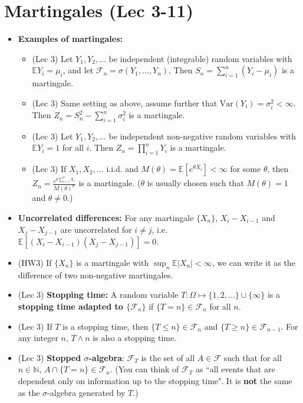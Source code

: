 \documentclass[twoside]{article}
\newcommand{\dis}{\displaystyle}
\newcommand\bbE{\mathbb{E}}
\newcommand\bbN{\mathbb{N}}
\newcommand\calF{\mathcal{F}}
\newcommand\Om{\Omega}
\newcommand\sg{\sigma}
\def\t{\theta}
\begin{document}
\section*{Martingales (Lec 3-11)}
\begin{itemize}
\item \textbf{Examples of martingales:}
\begin{itemize}
\item (Lec 3) Let $Y_1, Y_2, \dots$ be independent (integrable) random variables with $\bbE Y_i = \mu_i$, and let $\calF_n = \sg(Y_1, \dots, Y_n)$. Then $S_n = \dis\sum_{i=1}^n (Y_i - \mu_i)$ is a martingale.

\item (Lec 3) Same setting as above, assume further that $\text{Var} (Y_i) = \sg_i^2 < \infty$. Then $Z_n = S_n^2 - \dis\sum_{i=1}^n \sg_i^2$ is a martingale.

\item (Lec 3) Let $Y_1, Y_2, \dots$ be independent non-negative random variables with $\bbE Y_i = 1$ for all $i$. Then $Z_n = \dis\prod_{i=1}^n Y_i$ is a martingale.

\item (Lec 3) If $X_1, X_2, \dots$ i.i.d. and $M(\t) = \bbE [e^{\t X_i}] < \infty$ for some $\t$, then $Z_n = \dis\frac{e^{\t \sum_{i=1}^n X_i}}{M(\t)^n}$ is a martingale. ($\t$ is usually chosen such that $M(\t) = 1$ and $\t \neq 0$.)
\end{itemize}

\item \textbf{Uncorrelated differences:} For any martingale $\{ X_n \}$, $X_i - X_{i-1}$ and $X_j - X_{j-1}$ are uncorrelated for $i \neq j$, i.e. $\bbE[(X_i - X_{i-1})(X_j - X_{j-1})] = 0$.

\item (HW3) If $\{X_n\}$ is a martingale with $\dis\sup_n \bbE|X_n| < \infty$, we can write it as the difference of two non-negative martingales.

\item (Lec 3) \textbf{Stopping time:} A random variable $T : \Om \mapsto \{1, 2, \dots \} \cup \{ \infty \}$ is a \textbf{stopping time adapted to $\{\calF_n \}$} if $\{ T = n \} \in \calF_n$ for all $n$.

\item (Lec 3) If $T$ is a stopping time, then $\{ T \leq n\} \in \calF_n$ and $\{ T \geq n \} \in \calF_{n-1}$. For any integer $n$, $T \wedge n$ is also a stopping time.

\item (Lec 3) \textbf{Stopped $\sg$-algebra}: $\calF_T$ is the set of all $A \in \calF$ such that for all $n \in \bbN$, $A \cap \{ T = n \} \in \calF_n$. (You can think of $\calF_T$ as ``all events that are dependent only on information up to the stopping time". It is \textbf{not} the same as the $\sg$-algebra generated by $T$.)


\end{itemize}
\end{document}
